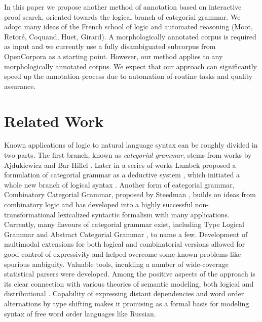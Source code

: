 \documentclass[a4paper]{article}
\theoremstyle{example-style}
\begin{document}
In this paper we propose another method of annotation based on interactive proof search, oriented towards the logical branch of categorial grammar. We adopt many ideas of the French school of logic and automated reasoning (Moot, Retor\'{e}, Coquand, Huet, Girard). A morphologically annotated corpus is required as input and we currently use a fully disambiguated subcorpus from OpenCorpora \parencite{granovsky2010opencorpora} as a starting point. However, our method applies to any morphologically annotated corpus. We expect that our approach can significantly speed up the annotation process due to automation of routine tasks and quality assurance.
     

\section{Related Work}

Known applications of logic to natural language syntax can be roughly divided in two parts. The first branch, known as \textit{categorial grammar}, stems from works by Ajdukiewicz and Bar-Hillel \parencite{ajdukiewicz1935,bar1953quasi}. Later in a series of works Lambek proposed a formulation of categorial grammar as a deductive system \parencite{lambek1958mathematics,lambek1961calculus}, which initiated a whole new branch of logical syntax \parencite{moot2012logic}. Another form of categorial grammar, Combinatory Categorial Grammar, proposed by Steedman \parencite{steedman2000syntactic}, builds on ideas from combinatory logic and has developed into a highly successful non-transformational lexicalized syntactic formalism with many applications. Currently, many flavours of categorial grammar exist, including Type Logical Grammar \parencite{morrill1994type} and Abstract Categorial Grammar \parencite{degroot2001towards}, to name a few. Development of multimodal extensions for both logical and combinatorial versions allowed for good control of expressivity and helped overcome some known problems like spurious ambiguity. Valuable tools, inculding a number of wide-coverage statistical parsers \parencite{curran2007linguistically,white2008open} were developed. Among the positive aspects of the approach is its clear connection with various theories of semantic modeling, both logical \parencite{steedman2000syntactic,bos2008wide,baldridge2002coupling} and distributional \parencite{maillard2014type}. Capability of expressing distant dependencies and word order alternations by type shifting makes it promising as a formal basis for modeling syntax of free word order languages like Russian.
\end{document}
